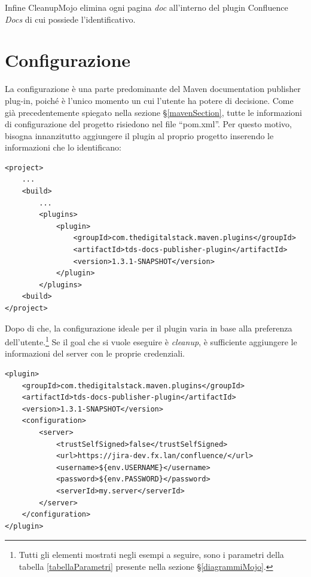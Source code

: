 Infine CleanupMojo elimina ogni pagina \emph{doc} all'interno del plugin Confluence \emph{Docs} di cui possiede l'identificativo.



\section{Configurazione} \label{configurazioneSec}
La configurazione è una parte predominante del Maven documentation publisher plug-in, poiché è l'unico momento un cui l'utente ha potere di decisione.
Come già precedentemente spiegato nella sezione \S\ref{mavenSection}, tutte le informazioni di configurazione del progetto risiedono nel file ``pom.xml''.
Per questo motivo, bisogna innanzitutto aggiungere il plugin al proprio progetto inserendo le informazioni che lo identificano:

\begin{lstlisting} 
<project>
    ...
    <build>
        ...
        <plugins>
            <plugin>
                <groupId>com.thedigitalstack.maven.plugins</groupId>
                <artifactId>tds-docs-publisher-plugin</artifactId>
                <version>1.3.1-SNAPSHOT</version>
            </plugin>
        </plugins>
    <build>
</project>
\end{lstlisting}

Dopo di che, la configurazione ideale per il plugin varia in base alla preferenza dell'utente.\footnote{Tutti gli elementi mostrati negli esempi a seguire, sono i parametri della tabella \ref{tabellaParametri} presente nella sezione \S\ref{diagrammiMojo}.}
Se il goal che si vuole eseguire è \emph{cleanup}, è sufficiente aggiungere le informazioni del server con le proprie credenziali.

\begin{lstlisting}
<plugin>
    <groupId>com.thedigitalstack.maven.plugins</groupId>
    <artifactId>tds-docs-publisher-plugin</artifactId>
    <version>1.3.1-SNAPSHOT</version>
    <configuration>
        <server>
            <trustSelfSigned>false</trustSelfSigned>
            <url>https://jira-dev.fx.lan/confluence/</url>
            <username>${env.USERNAME}</username>
            <password>${env.PASSWORD}</password>
            <serverId>my.server</serverId>
        </server>
    </configuration>
</plugin>
\end{lstlisting}

